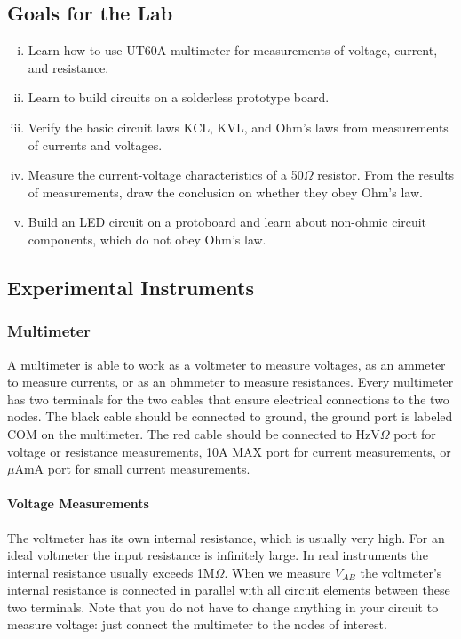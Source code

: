 \documentclass{article}
\begin{document}
\subsection{Goals for the Lab}
\begin{enumerate}[i.]
\item
Learn how to use UT60A multimeter for measurements of voltage, current, and resistance.
\item
Learn to build circuits on a solderless prototype board.
\item
Verify the basic circuit laws KCL, KVL, and Ohm’s laws from measurements of currents and voltages.
\item
Measure the current-voltage characteristics of a 50$\Omega$ resistor. From the results of measurements, draw the conclusion on whether they obey Ohm’s law.
\item
Build an LED circuit on a protoboard and learn about non-ohmic circuit components, which do not obey Ohm’s law.
\end{enumerate}

\subsection{Experimental Instruments}
\subsubsection{Multimeter}
A multimeter is able to work as a voltmeter to measure voltages, as an ammeter to measure currents, or as an ohmmeter to measure resistances.
Every multimeter has two terminals for the two cables that ensure electrical connections to the two nodes. The black cable should be connected to ground, the ground port is labeled COM on the multimeter. The red cable should be connected to HzV$\Omega$ port for voltage or resistance measurements, 10A MAX port for current measurements, or $\mu$AmA port for small current measurements.
\paragraph{Voltage Measurements}
The voltmeter has its own internal resistance, which is usually very high. For an ideal voltmeter the input resistance is infinitely large. In real instruments the internal resistance usually exceeds 1M$\Omega$. When we measure $V_{AB}$ the voltmeter’s internal resistance is connected in parallel with all circuit elements between these two terminals. Note that you do not have to change anything in your circuit to measure voltage: just connect the multimeter to the nodes of interest.
\end{document}
